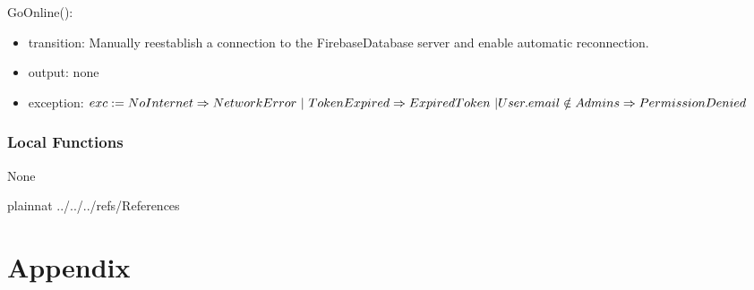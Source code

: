 \documentclass[12pt, titlepage]{article}
\begin{document}
\noindent GoOnline():
\begin{itemize}
\item transition: Manually reestablish a connection to the FirebaseDatabase server and enable automatic reconnection.
\item output: none
\item exception: $exc := NoInternet \Rightarrow NetworkError\ | \ TokenExpired \Rightarrow ExpiredToken\ | \\ User.email \notin Admins \Rightarrow PermissionDenied$
\end{itemize}

\subsubsection{Local Functions}

None

\newpage

 {plainnat}
 {../../../refs/References}

\newpage

\section{Appendix} \label{Appendix}

\end{document}
